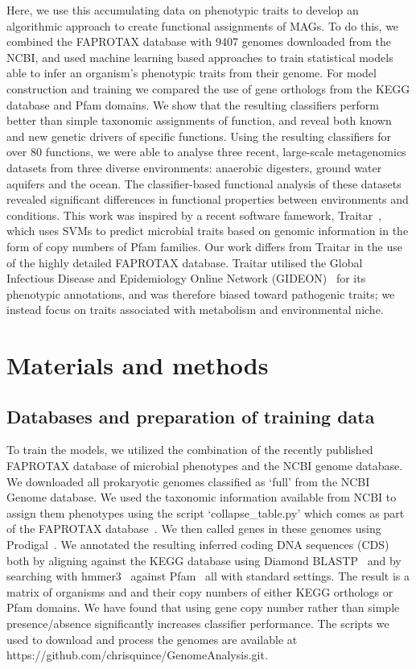 \documentclass[10pt,letterpaper]{article}
\begin{document}
Here, we use this accumulating data on phenotypic traits to develop an algorithmic approach to create functional assignments of MAGs. To do this, we combined the FAPROTAX database with 9407 genomes downloaded from the NCBI, and used machine learning based approaches to train statistical models able to infer an organism’s phenotypic traits from their genome. For model construction and training we compared the use of gene orthologs from the KEGG database and Pfam domains. We show that the resulting classifiers perform better than simple taxonomic assignments of function, and reveal both known and new genetic drivers of specific functions. Using the resulting classifiers for over 80 functions, we were able to analyse three recent, large-scale metagenomics datasets from three diverse environments: anaerobic digesters, ground water aquifers and the ocean. The classifier-based functional analysis of these datasets revealed significant differences in functional properties between environments and conditions. This work was inspired by a
recent software famework, Traitar~\cite{Weimann2016}, which uses SVMs to predict
microbial traits based on genomic information in the form of copy numbers of Pfam families. Our work differs from Traitar in the use of the highly detailed FAPROTAX database. Traitar utilised the Global Infectious Disease and Epidemiology Online Network
(GIDEON)~\cite{Berger2005} for its phenotypic annotations, and was therefore biased
toward pathogenic traits; we instead focus on traits associated with metabolism and
environmental niche.


\section*{Materials and methods}
\subsection*{Databases and preparation of training data}
To train the models, we utilized the combination of the recently published FAPROTAX database of microbial phenotypes and the NCBI genome database. We downloaded all prokaryotic genomes classified as `full' from the NCBI Genome database. We used the taxonomic information available from NCBI to assign them phenotypes using the script `collapse\_table.py' which comes as part of the FAPROTAX database~\cite{Louca2016}. We then called genes in these genomes using Prodigal~\cite{Hyatt2010}. We annotated the resulting inferred coding DNA sequences (CDS) both by aligning against the KEGG database using Diamond BLASTP~\cite{Buchfink2014} and by searching with hmmer3~\cite{Eddy2011} against Pfam~\cite{Finn2016} all with standard settings. The result is a matrix of organisms and and their copy numbers of either KEGG orthologs or Pfam domains. We have found that using gene copy number rather than simple presence/absence significantly increases classifier performance. The scripts we used to download and process the genomes are available at https://github.com/chrisquince/GenomeAnalysis.git.
\end{document}
